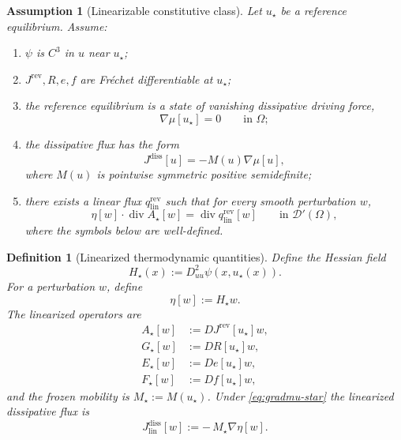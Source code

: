 \documentclass[11pt]{article}
\newtheorem{definition}[theorem]{Definition}
\newtheorem{assumption}[theorem]{Assumption}
\newcommand{\Om}{\Omega}
\newcommand{\grad}{\nabla}
\newcommand{\diver}{\operatorname{div}}
\newcommand{\lin}{\mathrm{lin}}
\begin{document}
\begin{assumption}[Linearizable constitutive class]\label{ass:lin}
Let \(u_\star\) be a reference equilibrium. Assume:
\begin{enumerate}[label=(\alph*),leftmargin=1.1cm]
    \item \(\psi\) is \(C^3\) in \(u\) near \(u_\star\);
    \item \(J^{\mathrm{rev}},R,e,f\) are Fr\'echet differentiable at \(u_\star\);
    \item the reference equilibrium is a state of vanishing dissipative driving force,
    \begin{equation}\label{eq:gradmu-star}
    \grad \mu[u_\star]=0
    \qquad \text{in }\Om;
    \end{equation}
    \item the dissipative flux has the form
    \begin{equation}\label{eq:gradient-diss}
    J^{\mathrm{diss}}[u]=-M(u)\grad \mu[u],
    \end{equation}
    where \(M(u)\) is pointwise symmetric positive semidefinite;
    \item there exists a linear flux \(q_{\lin}^{\mathrm{rev}}\) such that for every
    smooth perturbation \(w\),
    \begin{equation}\label{eq:lin-rev}
    \eta[w]\cdot \diver A_\star[w]
    =
    \diver q_{\lin}^{\mathrm{rev}}[w]
    \qquad \text{in }\mathscr{D}'(\Om),
    \end{equation}
    where the symbols below are well-defined.
\end{enumerate}
\end{assumption}

\begin{definition}[Linearized thermodynamic quantities]
Define the Hessian field
\begin{equation}\label{eq:Hstar}
H_\star(x):=D_{uu}^2\psi(x,u_\star(x)).
\end{equation}
For a perturbation \(w\), define
\begin{equation}\label{eq:eta}
\eta[w]:=H_\star w.
\end{equation}
The linearized operators are
\begin{align}
A_\star[w]&:=DJ^{\mathrm{rev}}[u_\star]w,\label{eq:Astar}\\
G_\star[w]&:=DR[u_\star]w,\label{eq:Gstar}\\
E_\star[w]&:=De[u_\star]w,\label{eq:Estar}\\
F_\star[w]&:=Df[u_\star]w,\label{eq:Fstar}
\end{align}
and the frozen mobility is \(M_\star:=M(u_\star)\). Under
\eqref{eq:gradmu-star} the linearized dissipative flux is
\begin{equation}\label{eq:Jlin}
J_{\lin}^{\mathrm{diss}}[w]
:=
-\,M_\star \grad \eta[w].
\end{equation}
\end{definition}
\end{document}
